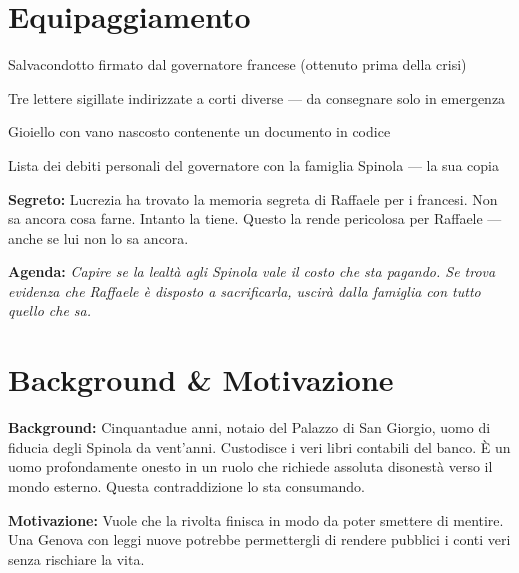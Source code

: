 \section*{Equipaggiamento}
\begin{goldlist}
\item Salvacondotto firmato dal governatore francese (ottenuto prima della crisi)
\item Tre lettere sigillate indirizzate a corti diverse — da consegnare solo in emergenza
\item Gioiello con vano nascosto contenente un documento in codice
\item Lista dei debiti personali del governatore con la famiglia Spinola — la sua copia
\end{goldlist}

\clearpage
\begin{secretbox}
\textbf{Segreto:} Lucrezia ha trovato la memoria segreta di Raffaele per i francesi. Non sa ancora cosa farne. Intanto la tiene. Questo la rende pericolosa per Raffaele — anche se lui non lo sa ancora.

\medskip\noindent\textcolor{SecretRed}{\textbf{Agenda:}} \textit{Capire se la lealtà agli Spinola vale il costo che sta pagando. Se trova evidenza che Raffaele è disposto a sacrificarla, uscirà dalla famiglia con tutto quello che sa.}
\end{secretbox}

\clearpage



\section*{Background \& Motivazione}
\begin{rulebox}{}
\textbf{Background:} Cinquantadue anni, notaio del Palazzo di San Giorgio, uomo di fiducia degli Spinola da vent'anni. Custodisce i veri libri contabili del banco. È un uomo profondamente onesto in un ruolo che richiede assoluta disonestà verso il mondo esterno. Questa contraddizione lo sta consumando.

\medskip\noindent\textcolor{SpinolaRed}{\textbf{Motivazione:}} Vuole che la rivolta finisca in modo da poter smettere di mentire. Una Genova con leggi nuove potrebbe permettergli di rendere pubblici i conti veri senza rischiare la vita.
\end{rulebox}

